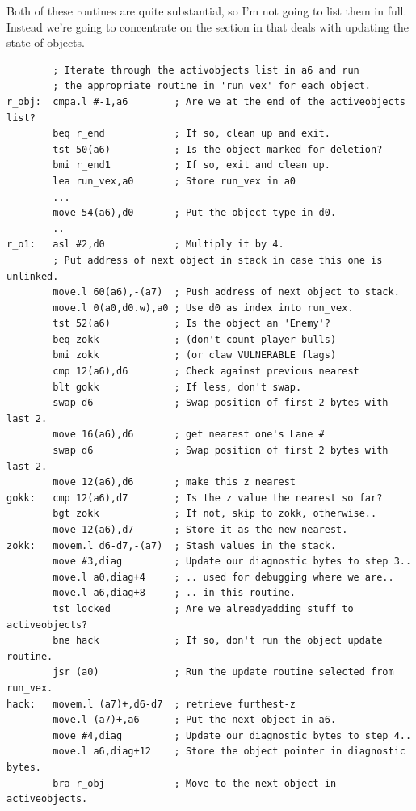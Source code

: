 Both of these routines are quite substantial, so I'm not going to list them in full. Instead
we're going to concentrate on the section in  that deals with updating
the state of objects.

\begin{lstlisting}
        ; Iterate through the activobjects list in a6 and run
        ; the appropriate routine in 'run_vex' for each object.
r_obj:  cmpa.l #-1,a6        ; Are we at the end of the activeobjects list?
        beq r_end            ; If so, clean up and exit.
        tst 50(a6)           ; Is the object marked for deletion?
        bmi r_end1           ; If so, exit and clean up.
        lea run_vex,a0       ; Store run_vex in a0
        ...
        move 54(a6),d0       ; Put the object type in d0.
        ..
r_o1:   asl #2,d0            ; Multiply it by 4.
        ; Put address of next object in stack in case this one is unlinked.
        move.l 60(a6),-(a7)  ; Push address of next object to stack. 
        move.l 0(a0,d0.w),a0 ; Use d0 as index into run_vex.
        tst 52(a6)           ; Is the object an 'Enemy'?
        beq zokk             ; (don't count player bulls)
        bmi zokk             ; (or claw VULNERABLE flags)
        cmp 12(a6),d6        ; Check against previous nearest
        blt gokk             ; If less, don't swap.
        swap d6              ; Swap position of first 2 bytes with last 2.
        move 16(a6),d6       ; get nearest one's Lane #
        swap d6              ; Swap position of first 2 bytes with last 2.
        move 12(a6),d6       ; make this z nearest
gokk:   cmp 12(a6),d7        ; Is the z value the nearest so far?
        bgt zokk             ; If not, skip to zokk, otherwise..
        move 12(a6),d7       ; Store it as the new nearest.
zokk:   movem.l d6-d7,-(a7)  ; Stash values in the stack.
        move #3,diag         ; Update our diagnostic bytes to step 3..
        move.l a0,diag+4     ; .. used for debugging where we are..
        move.l a6,diag+8     ; .. in this routine.
        tst locked           ; Are we alreadyadding stuff to activeobjects?
        bne hack             ; If so, don't run the object update routine.
        jsr (a0)             ; Run the update routine selected from run_vex.
hack:   movem.l (a7)+,d6-d7  ; retrieve furthest-z
        move.l (a7)+,a6      ; Put the next object in a6.
        move #4,diag         ; Update our diagnostic bytes to step 4..
        move.l a6,diag+12    ; Store the object pointer in diagnostic bytes.
        bra r_obj            ; Move to the next object in activeobjects.
\end{lstlisting}

